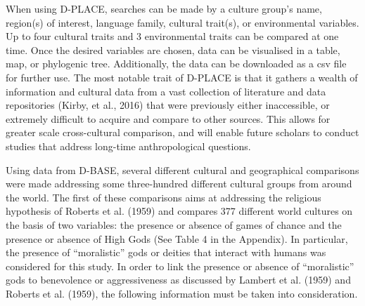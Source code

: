 \documentclass[%
	]{ijsra}
\begin{document}
 When using D-PLACE, searches can be made by a culture group’s name, region(s) of interest, language family, cultural trait(s), or environmental variables. Up to four cultural traits and 3 environmental traits can be compared at one time. Once the desired variables are chosen, data can be visualised in a table, map, or phylogenic tree. Additionally, the data can be downloaded as a csv file for further use. The most notable trait of D-PLACE is that it gathers a wealth of information and cultural data from a vast collection of literature and data repositories (Kirby, et al., 2016) that were previously either inaccessible, or extremely difficult to acquire and compare to other sources. This allows for greater scale cross-cultural comparison, and will enable future scholars to conduct studies that address long-time anthropological questions.


Using data from D-BASE, several different cultural and geographical comparisons were made addressing some three-hundred different cultural groups from around the world. The first of these comparisons aims at addressing the religious hypothesis of Roberts et al. (1959) and compares 377 different world cultures on the basis of two variables: the presence or absence of games of chance and the presence or absence of High Gods (See Table 4 in the Appendix). In particular, the presence of “moralistic” gods or deities that interact with humans was considered for this study. In order to link the presence or absence of “moralistic” gods to benevolence or aggressiveness as discussed by Lambert et al. (1959) and Roberts et al. (1959), the following information must be taken into consideration. 
\end{document}
